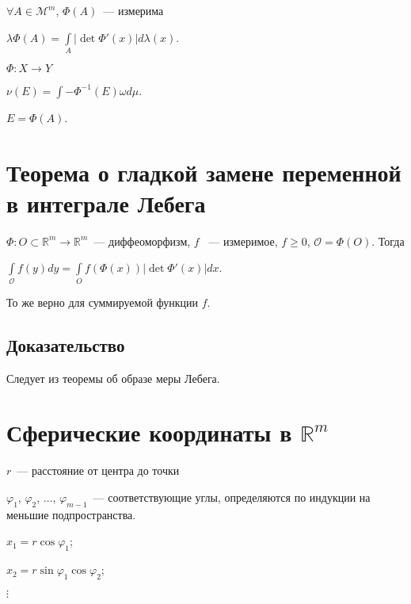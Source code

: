 \documentclass{article}
\begin{document}
    \newpage
    
    $\forall A \in \mathcal{M}^m$, $\Phi(A)$~--- измерима
    
    $\lambda \Phi(A) = \int\limits_A \left| \det \Phi'(x) \right| d \lambda (x)$.
    
    $\Phi: X \rightarrow Y$
    
    $\nu(E) = \int\limits-{\Phi^{-1}(E)} \omega d \mu$.
    
    $E = \Phi(A)$.
    
    \newpage
    
    \section{Теорема о гладкой замене переменной в интеграле Лебега}
    
        $\Phi: O \subset \mathbb{R}^m \rightarrow \mathbb{R}^m$~--- диффеоморфизм, $f$ ~--- измеримое, $f \geqslant 0$, $\mathcal{O} = \Phi \left( O \right)$. Тогда
            
        $\int\limits_{\mathcal{O}} f(y) dy = \int\limits_O f \left(\Phi(x)\right) \left| \det \Phi'(x) \right| dx$.
            
        То же верно для суммируемой функции $f$.
        
        \subsection{Доказательство}
        
            Следует из теоремы об образе меры Лебега.
        
    \newpage
    
    \section{Сферические координаты в $\mathbb{R}^m$}
    
        $r$~--- расстояние от центра до точки
                    
        $\varphi_1$, $\varphi_2$, $\ldots$, $\varphi_{m - 1}$~--- соответствующие углы, определяются по индукции на меньшие подпространства.
                    
        $x_1 = r \cos \varphi_1$;
                    
        $x_2 = r \sin \varphi_1 \cos \varphi_2$;
                    
        $\vdots$
                    
\end{document}
